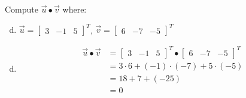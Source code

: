\documentclass[../main.tex]{subfiles}
\begin{document}
Compute $\vec{u}\bullet\vec{v}$ where:
\begin{enumerate}[a)]
	\setcounter{enumi}{3}
	\item
		$\vec{u} = \begin{bmatrix}3&-1&5\end{bmatrix}^T$,
		$\vec{v} = \begin{bmatrix}6&-7&-5\end{bmatrix}^T$
\end{enumerate}

\solution
\begin{enumerate}[a)]
	\setcounter{enumi}{3}
	\item 
		\begin{align*}
			\vec{u}\bullet\vec{v} &=
			\begin{bmatrix}3&-1&5\end{bmatrix}^T
			\bullet
			\begin{bmatrix}6&-7&-5\end{bmatrix}^T \\
			&= 3\cdot6 + (-1)\cdot(-7) + 5\cdot(-5) \\
			&= 18 + 7 + (-25) \\
			&= 0
		\end{align*}
\end{enumerate}
\end{document}

